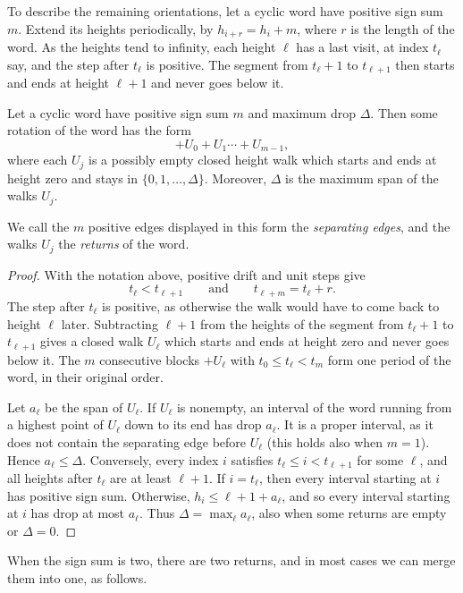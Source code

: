To describe the remaining orientations, let a cyclic word have positive sign sum $m$. Extend its heights periodically, by $h_{i+r}=h_i+m$, where $r$ is the length of the word. As the heights tend to infinity, each height $\ell$ has a last visit, at index $t_\ell$ say, and the step after $t_\ell$ is positive. The segment from $t_\ell+1$ to $t_{\ell+1}$ then starts and ends at height $\ell+1$ and never goes below it.

\begin{lemma}
\label{height400:last-exits}
Let a cyclic word have positive sign sum $m$ and maximum drop $\Delta$.
Then some rotation of the word has the form
\[
                 +U_0+U_1\cdots+U_{m-1},
\]
where each $U_j$ is a possibly empty closed height walk which starts and ends at height zero and stays in $\{0,1,\ldots,\Delta\}$. Moreover, $\Delta$ is the maximum span of the walks $U_j$.
\end{lemma}

We call the $m$ positive edges displayed in this form the \emph{separating edges}, and the walks $U_j$ the \emph{returns} of the word.

\begin{proof}
With the notation above, positive drift and unit steps give
\[
             t_\ell<t_{\ell+1}\qquad\text{and}\qquad t_{\ell+m}=t_\ell+r.
\]
The step after $t_\ell$ is positive, as otherwise the walk would have to come back to height $\ell$ later. Subtracting $\ell+1$ from the heights of the segment from $t_\ell+1$ to $t_{\ell+1}$ gives a closed walk $U_\ell$ which starts and ends at height zero and never goes below it. The $m$ consecutive blocks $+U_\ell$ with $t_0\le t_\ell<t_m$ form one period of the word, in their original order.

Let $a_\ell$ be the span of $U_\ell$. If $U_\ell$ is nonempty, an interval of the word running from a highest point of $U_\ell$ down to its end has drop $a_\ell$. It is a proper interval, as it does not contain the separating edge before $U_\ell$ (this holds also when $m=1$). Hence $a_\ell\le\Delta$.
Conversely, every index $i$ satisfies $t_\ell\le i<t_{\ell+1}$ for some $\ell$, and all heights after $t_\ell$ are at least $\ell+1$. If $i=t_\ell$, then every interval starting at $i$ has positive sign sum. Otherwise, $h_i\le\ell+1+a_\ell$, and so every interval starting at $i$ has drop at most $a_\ell$. Thus $\Delta=\max_\ell a_\ell$, also when some returns are empty or $\Delta=0$.
\end{proof}

When the sign sum is two, there are two returns, and in most cases we can merge them into one, as follows.

